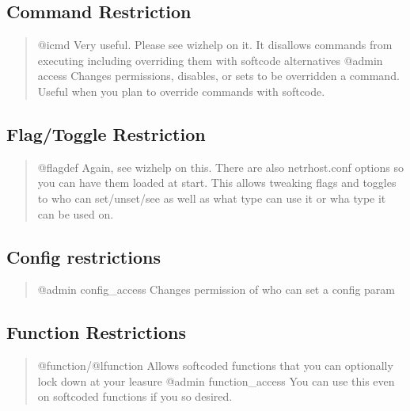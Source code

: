 \documentclass[letterpaper,10pt,english]{sphinxmanual}
\begin{document}
\subsection{Command Restriction}
\label{\detokenize{security:command-restriction}}\begin{quote}

\sphinxAtStartPar
@icmd    \sphinxhyphen{} Very useful.   Please see wizhelp on it.  It disallows commands from executing including overriding them with softcode alternatives
@admin access \sphinxhyphen{} Changes permissions, disables, or sets to be overridden a command.  Useful when you plan to override commands with softcode.
\end{quote}


\subsection{Flag/Toggle Restriction}
\label{\detokenize{security:flag-toggle-restriction}}\begin{quote}

\sphinxAtStartPar
@flagdef \sphinxhyphen{} Again, see wizhelp on this.  There are also netrhost.conf options so you can have them loaded at start.  This allows tweaking flags and toggles to who can set/unset/see as well as what type can use it or wha type it can be used on.
\end{quote}


\subsection{Config restrictions}
\label{\detokenize{security:config-restrictions}}\begin{quote}

\sphinxAtStartPar
@admin config\_access \sphinxhyphen{} Changes permission of who can set a config param
\end{quote}


\subsection{Function Restrictions}
\label{\detokenize{security:function-restrictions}}\begin{quote}

\sphinxAtStartPar
@function/@lfunction \textendash{} Allows softcoded functions that you can optionally lock down at your leasure
@admin function\_access \textendash{} You can use this even on softcoded functions if you so desired.
\end{quote}
\end{document}
